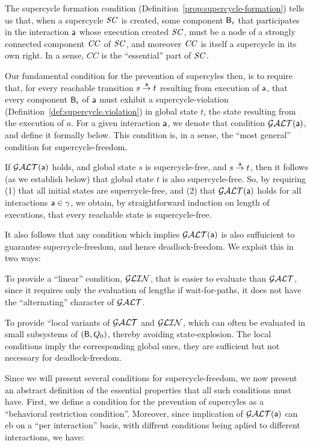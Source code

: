 
The supercycle formation condition (Definition~\ref{prop:supercycle-formation}) tells us that, when a supercycle $\SC$ is
created, some component $\B_i$ that participates in the interaction $\act$ whose execution created $\SC$, must be a node
of a strongly connected component $\CC$ of $\SC$, and moreover $\CC$ is itself a supercycle in its own right. In a sense,
$CC$ is the ``essential'' part of $\SC$.

Our fundamental condition for the prevention of supercyles then, is to require
that, for every reachable transition  $s \goesto[\act] t$ resulting from execution of $\act$, 
that every component $\B_i$ of $\act$
must exhibit a supercycle-violation (Definition~\ref{def:supercycle.violation}) in global state $t$, \ie the state resulting
from the execution of $a$. For a given interaction $\act$, we denote that condition $\GAO(\act)$, and define it formally below.
This condition is, in a sense, the ``most general'' condition for supercycle-freedom.

If $\GAO(\act)$ holds, and global state
$s$ is supercycle-free, and $s \goesto[\act] t$, then it follows (as
we establish below) that global state $t$ is also supercycle-free. 
So, by requiring (1) that all initial states are supercycle-free, and
(2) that $\GAO(\act)$ holds for all interactions $\act \in \gamma$, we
obtain, by straightforward induction on length of executions, that every reachable state is supercycle-free.

It also follows that any condition which implies $\GAO(\act)$ is also suffuicient to guarantee  supercycle-freedom, and
hence deadlock-freedom. We exploit this in two ways:
\bn

\item To provide a ``linear'' condition, $\GLin$, that is easier to evaluate than $\GAO$, since it requires only the
evaluation of lengths if wait-for-paths, \ie it does not have the ``alternating'' character of $\GAO$. 

\item To provide ``local variants of $\GAO$ and $\GLin$,  which can often be
evaluated in small subsystems of $(\B, Q_0)$, thereby avoiding state-explosion. The local conditions imply the
corresponding global ones, \ie they are sufficient but not necessary for deadlock-freedom.

\en

Since we will present several conditions for supercycle-freedom, we now present an abstract definition of the essential
properties that all such conditions must have. First, we define a condition for the prevention of supercyles as a 
``behavioral restriction condition''. Moreover, since implication of $\GAO(\act)$ can eb on a ``per interaction'' basis,
with diffrent conditions being aplied to different interactions, we have:


